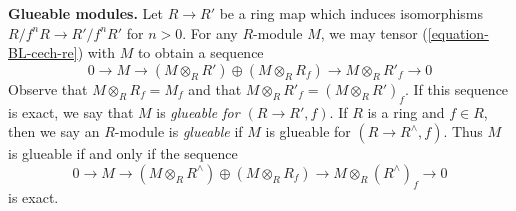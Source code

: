 {\bf Glueable modules.}
Let $R \to R'$ be a ring map which induces isomorphisms
$R/f^nR \to R'/f^nR'$ for $n > 0$. For any $R$-module $M$, we
may tensor (\ref{equation-BL-cech-re}) with $M$ to obtain a sequence
\begin{equation}
\label{equation-BL-cech-mod-re}
0 \to M \to (M \otimes_R R') \oplus (M \otimes_R R_f) \to
M \otimes_R R'_f \to 0
\end{equation}
Observe that $M \otimes_R R_f = M_f$ and that
$M \otimes_R R'_f = (M \otimes_R R')_f$.
If this sequence is exact, we say that $M$ is
\emph{glueable for $(R \to R', f)$}.
If $R$ is a ring and $f \in R$, then we say an $R$-module
is \emph{glueable} if $M$ is glueable for $(R \to R^\wedge, f)$.
Thus $M$ is glueable if and only if the sequence
\begin{equation}
\label{equation-BL-cech-mod}
0 \to M \to (M \otimes_R R^\wedge) \oplus (M \otimes_R R_f) \to
M \otimes_R (R^\wedge)_f \to 0
\end{equation}
is exact.

